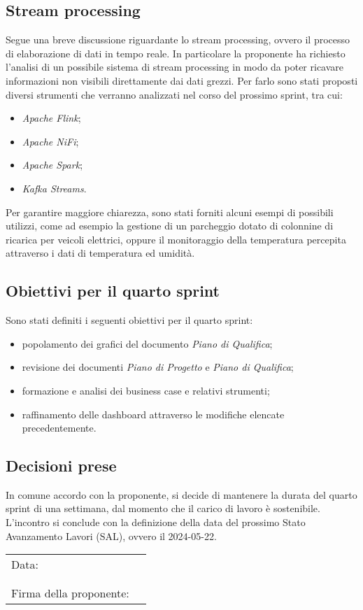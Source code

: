 \documentclass[italian,12pt]{article}
\begin{document}
\newpage
\subsection{Stream processing}
Segue una breve discussione riguardante lo stream processing, ovvero il processo di elaborazione di dati in tempo reale. In particolare la proponente
ha richiesto l'analisi di un possibile sistema di stream processing in modo da poter ricavare informazioni non visibili direttamente dai dati grezzi.
Per farlo sono stati proposti diversi strumenti che verranno analizzati nel corso del prossimo sprint, tra cui:
\begin{itemize}
	\item \textit{Apache Flink};
	\item \textit{Apache NiFi};
	\item \textit{Apache Spark};
	\item \textit{Kafka Streams}.
\end{itemize}
Per garantire maggiore chiarezza, sono stati forniti alcuni esempi di possibili utilizzi, come ad esempio la gestione di un parcheggio dotato di
colonnine di ricarica per veicoli elettrici, oppure il monitoraggio della temperatura percepita attraverso i dati di temperatura ed umidità.

\subsection{Obiettivi per il quarto sprint}
Sono stati definiti i seguenti obiettivi per il quarto sprint:
\begin{itemize}
	\item popolamento dei grafici del documento \textit{Piano di Qualifica};
	\item revisione dei documenti \textit{Piano di Progetto} e \textit{Piano di Qualifica};
	\item formazione e analisi dei business case e relativi strumenti;
	\item raffinamento delle dashboard attraverso le modifiche elencate precedentemente.
\end{itemize}

\subsection{Decisioni prese}
In comune accordo con la proponente, si decide di mantenere la durata del quarto sprint di una settimana,
dal momento che il carico di lavoro è sostenibile.
L'incontro si conclude con la definizione della data del prossimo Stato Avanzamento Lavori (SAL),
ovvero il 2024-05-22.

\newpage
\begin{table}[b]
	\begin{tabular}{@{}p{5cm}p{10cm}@{}}
		Data:  & \hrulefill \\
		       &            \\
		       &            \\
		Firma della proponente: & \hrulefill \\
	\end{tabular}
\end{table}
\end{document}
